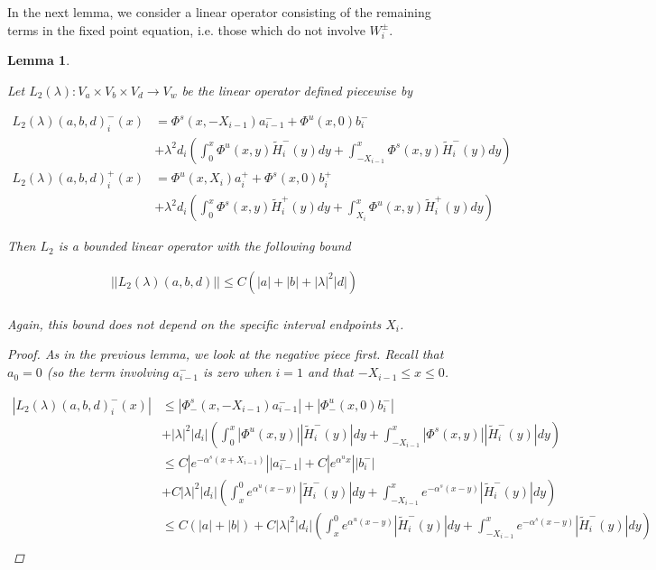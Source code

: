 \documentclass[12pt]{article}
\newtheorem{lemma}{Lemma}
\begin{document}
In the next lemma, we consider a linear operator consisting of the remaining terms in the fixed point equation, i.e. those which do not involve $W_i^\pm$.

\begin{lemma}\label{L2}

Let $L_2(\lambda): V_a \times V_b \times V_d \rightarrow V_w$ be the linear operator defined piecewise by

\begin{align*}
L_2(\lambda)(a, b, d)_i^-(x) &= \Phi^s(x, -X_{i-1})a^-_{i-1} + \Phi^u(x, 0)b_i^- \\
&+ \lambda^2 d_i \left( \int_0^x \Phi^u(x, y)\tilde{H}_i^-(y) dy  + \int_{-X_{i-1}}^x \Phi^s(x, y)\tilde{H}_i^-(y) dy \right)\\
L_2(\lambda)(a, b, d)_i^+(x) &= \Phi^u(x, X_i)a^+_{i} + \Phi^s(x, 0)b_i^+ \\
&+ \lambda^2 d_i \left( \int_0^x \Phi^s(x, y)\tilde{H}_i^+(y) dy + \int_{X_{i}}^x \Phi^u(x, y)\tilde{H}_i^+(y) dy \right)
\end{align*}

Then $L_2$ is a bounded linear operator with the following bound

\begin{align*}
||L_2(\lambda)(a, b, d)|| \leq C(|a| + |b| + |\lambda|^2 |d|)  \\
\end{align*}

Again, this bound does not depend on the specific interval endpoints $X_i$.

\begin{proof}

As in the previous lemma, we look at the negative piece first. Recall that $a_0 = 0$ (so the term involving $a^-_{i-1}$ is zero when $i = 1$ and that $-X_{i-1} \leq x \leq 0$. 

\begin{align*}
| L_2(\lambda)(a, b, d)_i^-(x)| &\leq |\Phi^s_-(x, -X_{i-1})a^-_{i-1}| + |\Phi^u_-(x, 0)b_i^-| \\
&+ |\lambda|^2 |d_i| \left( \int_0^x |\Phi^u(x, y)||\tilde{H}_i^-(y)| dy  + \int_{-X_{i-1}}^x |\Phi^s(x, y)||\tilde{H}_i^-(y)| dy \right) \\
&\leq C |e^{-\alpha^s (x + X_{i-1})}||a^-_{i-1}| + C |e^{\alpha^u x}||b_i^-| \\
&+ C|\lambda|^2 |d_i| \left( \int_x^0 e^{\alpha^u (x - y)}|\tilde{H}_i^-(y)| dy + \int_{-X_{i-1}}^x e^{-\alpha^s (x - y)}|\tilde{H}_i^-(y)| dy\right) \\
&\leq C(|a| + |b|) + C|\lambda|^2 |d_i| \left( \int_x^0 e^{\alpha^u (x - y)}|\tilde{H}_i^-(y)| dy + \int_{-X_{i-1}}^x e^{-\alpha^s (x - y)}|\tilde{H}_i^-(y)| dy\right) \\
\end{align*}


\end{proof}
\end{lemma}
\end{document}
